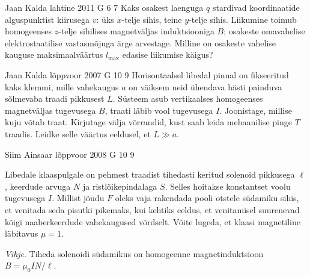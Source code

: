 \documentclass[11pt]{article}
\begin{document}
{%
{Jaan Kalda} %
{lahtine} %
{2011} %
{G 6} %
{7} %
{
\ifStatement
Kaks osakest laenguga $q$ stardivad koordinaatide alguspunktist kiirusega $v$:
üks $x$-telje sihis, teine $y$-telje sihis.
Liikumine toimub homogeenses $z$-telje sihilises magnetväljas induktsiooniga
$B$; osakeste omavahelise
elektrostaatilise vastasmõjuga ärge arvestage. Milline on osakeste vahelise
kauguse maksimaalväärtus $l_{\max}$ edasise liikumise käigus?
\fi
}

{Jaan Kalda} %
{lõppvoor} %
{2007} %
{G 10} %
{9} %
{
\ifStatement
Horisontaalsel libedal pinnal on fikseeritud kaks klemmi, mille vahekaugus $a$ on väiksem neid ühendava hästi painduva sõlmevaba traadi pikkusest $L$. Süsteem asub vertikaalses homogeenses magnetväljas tugevusega $B$, traati läbib vool tugevusega $I$. Joonistage, millise kuju võtab traat. Kirjutage välja võrrandid, kust saab leida mehaanilise pinge $T$ traadis. Leidke selle väärtus eeldusel, et $L \gg a$.
\fi
}

{Siim Ainsaar} %
{lõppvoor} %
{2008} %
{G 10} %
{9} %
{
\ifStatement
Libedale klaaspulgale on pehmest traadist tihedasti keritud solenoid pikkusega $\ell$, keerdude arvuga $N$ ja ristlõikepindalaga $S$. Selles hoitakse konstantset voolu tugevusega $I$. Millist jõudu $F$ oleks vaja rakendada pooli otstele südamiku sihis, et venitada seda pisutki pikemaks, kui kehtiks eeldus, et venitamisel suurenevad kõigi naaberkeerdude vahekaugused võrdselt. Võite lugeda, et klaasi magnetiline läbitavus $\mu = 1$. 

\emph{Vihje}. Tiheda solenoidi südamikus on homogeenne magnetinduktsioon$ B = \mu_0IN/\ell$.
\fi
}

}
\end{document}

